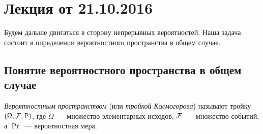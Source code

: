 \section{Лекция от 21.10.2016}

Будем дальше двигаться в сторону непрерывных вероятностей. Наша задача состоит в определении вероятностного пространства в общем случае.

\subsection{Понятие вероятностного пространства в общем случае}
\begin{definition}
	\emph{Вероятностным пространством} (или \emph{тройкой Колмогорова}) называют тройку \((\Omega, \F, \Pr)\), где \(\Omega\)~--- множество элементарных исходов, \(\mathcal{F}\)~--- множество событий, а \(\Pr\)~--- вероятностная мера.
\end{definition}

